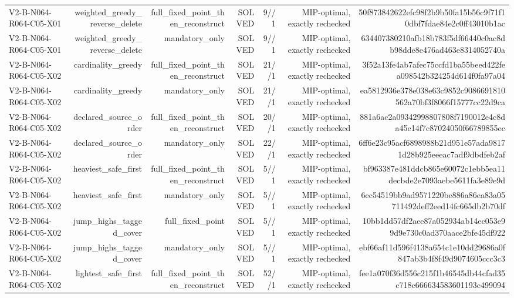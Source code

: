 {\begin{longtable}{lrrrrrr}
V2-B-N064-R064-C05-X01 & weighted\_greedy\_reverse\_delete & full\_fixed\_point\_then\_reconstruct & SOLVED & 9//1 & MIP-optimal, exactly rechecked & 50f873842622efc98f2b9b50fa15b56c9f71f10dbf7fdae84e2c0ff43010b1ac \\
V2-B-N064-R064-C05-X01 & weighted\_greedy\_reverse\_delete & mandatory\_only & SOLVED & 9//1 & MIP-optimal, exactly rechecked & 634407380210afb18b783f5df66440c0ac8db98dde8e476ad463e8314052740a \\
V2-B-N064-R064-C05-X02 & cardinality\_greedy & full\_fixed\_point\_then\_reconstruct & SOLVED & 21//1 & MIP-optimal, exactly rechecked & 3f52a13fe4ab7afec75ccfd1ba55beed422fea098542b324254d614f0fa97a04 \\
V2-B-N064-R064-C05-X02 & cardinality\_greedy & mandatory\_only & SOLVED & 21//1 & MIP-optimal, exactly rechecked & ea5812936e378e038e63c9852c9086691810562a70bf3f8066f15777cc22d9ca \\
V2-B-N064-R064-C05-X02 & declared\_source\_order & full\_fixed\_point\_then\_reconstruct & SOLVED & 20//1 & MIP-optimal, exactly rechecked & 881a6ac2a09342998807808f7190012e4c8da45c14f7c87024050f66789855ec \\
V2-B-N064-R064-C05-X02 & declared\_source\_order & mandatory\_only & SOLVED & 22//1 & MIP-optimal, exactly rechecked & 6ff6e23c95acf6898988b21d951e57ada98171d28b925eeeac7adf9dbdfeb2af \\
V2-B-N064-R064-C05-X02 & heaviest\_safe\_first & full\_fixed\_point\_then\_reconstruct & SOLVED & 5//1 & MIP-optimal, exactly rechecked & bf963387e481ddcb865e60072c1ebb5ea11decbde2e7093aebe5611fa3e89e9d \\
V2-B-N064-R064-C05-X02 & heaviest\_safe\_first & mandatory\_only & SOLVED & 5//1 & MIP-optimal, exactly rechecked & 6ec54519bb9ad9571220be886a86ea83a05711492deff2eed14fc665db2b70df \\
V2-B-N064-R064-C05-X02 & jump\_highs\_tagged\_cover & full\_fixed\_point & SOLVED & 5//1 & MIP-optimal, exactly rechecked & 10bb1dd57df2aee87a052934ab14ec053e99d9e730c0ad370aace2bfe45df922 \\
V2-B-N064-R064-C05-X02 & jump\_highs\_tagged\_cover & mandatory\_only & SOLVED & 5//1 & MIP-optimal, exactly rechecked & ebf66af11d596f4138a654c1e10dd29686a0f847ab3b4f8f49d9074605ccc3c3 \\
V2-B-N064-R064-C05-X02 & lightest\_safe\_first & full\_fixed\_point\_then\_reconstruct & SOLVED & 52//1 & MIP-optimal, exactly rechecked & fee1a070f36d556c215f1b46545db44cfad35c718c666634583601193c499094 \\

\end{longtable}}
